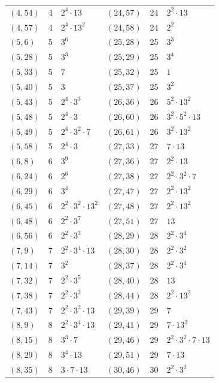 \documentclass[11pt]{article}
\begin{document}
\begin{longtable}{@{}lrl@{\qquad}lrl@{}}
$(4,54)$ & 4 & $2^{4}\cdot 13$ & $(24,57)$ & 24 & $2^{2}\cdot 13$\\
$(4,57)$ & 4 & $2^{4}\cdot 13^{2}$ & $(24,58)$ & 24 & $2^{2}$\\
$(5,6)$ & 5 & $3^{6}$ & $(25,28)$ & 25 & $3^{3}$\\
$(5,28)$ & 5 & $3^{3}$ & $(25,29)$ & 25 & $3^{4}$\\
$(5,33)$ & 5 & $7$ & $(25,32)$ & 25 & $1$\\
$(5,40)$ & 5 & $3$ & $(25,37)$ & 25 & $3^{2}$\\
$(5,43)$ & 5 & $2^{4}\cdot 3^{3}$ & $(26,36)$ & 26 & $5^{2}\cdot 13^{2}$\\
$(5,48)$ & 5 & $2^{4}\cdot 3$ & $(26,60)$ & 26 & $3^{2}\cdot 5^{2}\cdot 13$\\
$(5,49)$ & 5 & $2^{4}\cdot 3^{2}\cdot 7$ & $(26,61)$ & 26 & $3^{2}\cdot 13^{2}$\\
$(5,58)$ & 5 & $2^{4}\cdot 3$ & $(27,33)$ & 27 & $7\cdot 13$\\
$(6,8)$ & 6 & $3^{9}$ & $(27,36)$ & 27 & $2^{2}\cdot 13$\\
$(6,24)$ & 6 & $2^{6}$ & $(27,38)$ & 27 & $2^{2}\cdot 3^{2}\cdot 7$\\
$(6,29)$ & 6 & $3^{4}$ & $(27,47)$ & 27 & $2^{2}\cdot 13^{2}$\\
$(6,45)$ & 6 & $2^{2}\cdot 3^{2}\cdot 13^{2}$ & $(27,48)$ & 27 & $2^{2}\cdot 13^{2}$\\
$(6,48)$ & 6 & $2^{2}\cdot 3^{7}$ & $(27,51)$ & 27 & $13$\\
$(6,56)$ & 6 & $2^{2}\cdot 3^{3}$ & $(28,29)$ & 28 & $2^{2}\cdot 3^{4}$\\
$(7,9)$ & 7 & $2^{2}\cdot 3^{4}\cdot 13$ & $(28,30)$ & 28 & $2^{2}\cdot 3^{2}$\\
$(7,14)$ & 7 & $3^{2}$ & $(28,37)$ & 28 & $2^{2}\cdot 3^{4}$\\
$(7,32)$ & 7 & $2^{2}\cdot 3^{5}$ & $(28,40)$ & 28 & $13$\\
$(7,38)$ & 7 & $2^{2}\cdot 3^{2}$ & $(28,44)$ & 28 & $2^{2}\cdot 13^{2}$\\
$(7,43)$ & 7 & $2^{2}\cdot 3^{2}\cdot 13$ & $(29,39)$ & 29 & $7$\\
$(8,9)$ & 8 & $2^{2}\cdot 3^{4}\cdot 13$ & $(29,41)$ & 29 & $7\cdot 13^{2}$\\
$(8,15)$ & 8 & $3^{3}\cdot 7$ & $(29,46)$ & 29 & $2^{2}\cdot 3^{2}\cdot 7\cdot 13$\\
$(8,29)$ & 8 & $3^{4}\cdot 13$ & $(29,51)$ & 29 & $7\cdot 13$\\
$(8,35)$ & 8 & $3\cdot 7\cdot 13$ & $(30,46)$ & 30 & $2^{2}\cdot 3^{2}$\\

\end{longtable}
\end{document}
